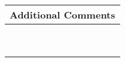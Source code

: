 \documentclass[letterpaper, 10pt]{article} %
\begin{document}
\begin{tabular}{l}

\begin{minipage}{6in} \hspace*{-.175in} {\bf Additional Comments} \vspace*{.25in} \end{minipage} \\ \hline

\begin{minipage}{6in} \vspace*{.25in} \end{minipage} \\ \hline

\begin{minipage}{6in} \vspace*{.25in} \end{minipage} \\ \hline

\begin{minipage}{6in} \vspace*{.25in} \end{minipage} \\ \hline

\begin{minipage}{6in} \vspace*{.25in} \end{minipage} \\ \hline

\begin{minipage}{6in} \vspace*{.25in} \end{minipage} \\ \hline

\begin{minipage}{6in} \vspace*{.25in} \end{minipage} \\ \hline

\begin{minipage}{6in} \vspace*{.25in} \end{minipage} \\ \hline

\begin{minipage}{6in} \vspace*{.25in} \end{minipage} \\ \hline

\begin{minipage}{6in} \vspace*{.25in} \end{minipage} \\ \hline


\end{tabular}
\end{document}
